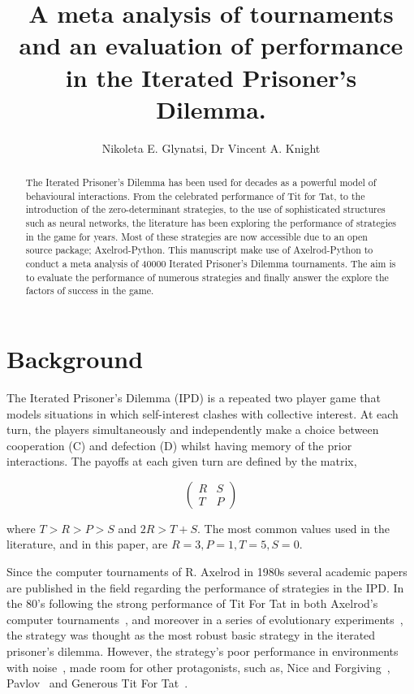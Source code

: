 \documentclass{article}
\title{A meta analysis of tournaments and an evaluation of performance in the
Iterated Prisoner's Dilemma.}
\author{Nikoleta E. Glynatsi, Dr Vincent A. Knight}
\date{}
\begin{document}
\maketitle

\begin{abstract}

The Iterated Prisoner's Dilemma has been used for decades as a powerful model of
behavioural interactions. From the celebrated performance of Tit for Tat, to the
introduction of the zero-determinant strategies, to the use of sophisticated
structures such as neural networks, the literature has been exploring the
performance of strategies in the game for years. Most of these strategies are
now accessible due to an open source package; Axelrod-Python. This manuscript
make use of Axelrod-Python to conduct a meta analysis of 40000 Iterated
Prisoner's Dilemma tournaments. The aim is to evaluate the performance of
numerous strategies and finally answer the explore the factors of success in the
game.
\end{abstract}

\section{Background}

The Iterated Prisoner's Dilemma (IPD) is a repeated two player game that models
situations in which self-interest clashes with collective interest. At each turn,
the players simultaneously and independently make a choice between cooperation (C) and
defection (D) whilst having memory of the prior interactions.
The payoffs at each given turn are defined by the matrix,

\[\begin{pmatrix}
R & S \\
T & P
\end{pmatrix}\]

where \(T > R > P > S\) and \(2R > T + S\). The most common values used in
the literature, and in this paper, are $R=3, P=1, T=5, S=0$.

Since the computer tournaments of R. Axelrod in 1980s several academic papers
are published in the field regarding the performance of strategies in the
IPD. In the 80's following the strong performance of Tit For Tat
in both Axelrod's computer tournaments~\cite{Axelrod1980a, Axelrod1980b}, and
moreover in a series of evolutionary experiments~\cite{Axelrod1981}, the strategy
was thought as the most robust basic strategy in the iterated prisoner's
dilemma. However, the strategy's poor performance in environments with
noise~\cite{Bendor1991, Donninger1986, Molander1985, Hammerstein1984},
made room for other protagonists, such as, Nice and Forgiving~\cite{Bendor1991},
Pavlov~\cite{Nowak1993} and Generous Tit For Tat~\cite{Nowak1992}.
\end{document}
